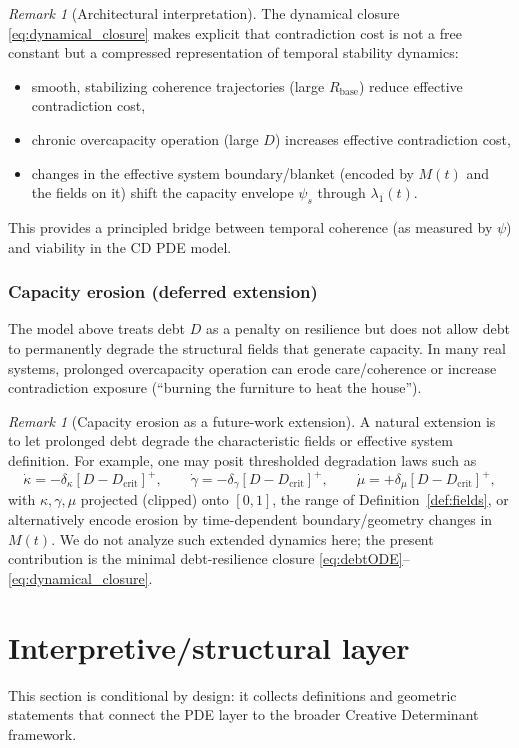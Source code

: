 \documentclass[11pt]{article}
\theoremstyle{plain}
\theoremstyle{definition}
\theoremstyle{remark}
\newtheorem{remark}[theorem]{Remark}
\begin{document}
\begin{remark}[Architectural interpretation]
The dynamical closure \eqref{eq:dynamical_closure} makes explicit that contradiction cost is not a free constant but a compressed representation of temporal stability dynamics:
\begin{itemize}
\item smooth, stabilizing coherence trajectories (large $R_{\mathrm{base}}$) reduce effective contradiction cost,
\item chronic overcapacity operation (large $D$) increases effective contradiction cost,
\item changes in the effective system boundary/blanket (encoded by $M(t)$ and the fields on it) shift the capacity envelope $\psi_s$ through $\lambda_1(t)$.
\end{itemize}
This provides a principled bridge between temporal coherence (as measured by $\psi$) and viability in the CD PDE model.
\end{remark}

\subsubsection*{Capacity erosion (deferred extension)}
The model above treats debt $D$ as a penalty on resilience but does not allow debt to permanently degrade the structural fields that generate capacity. In many real systems, prolonged overcapacity operation can erode care/coherence or increase contradiction exposure (``burning the furniture to heat the house'').

\begin{remark}[Capacity erosion as a future-work extension]\label{rem:capacity_erosion}
A natural extension is to let prolonged debt degrade the characteristic fields or effective system definition. For example, one may posit thresholded degradation laws such as
\[
\dot\kappa = -\delta_\kappa [D-D_{\mathrm{crit}}]^+,\qquad
\dot\gamma = -\delta_\gamma [D-D_{\mathrm{crit}}]^+,\qquad
\dot\mu = +\delta_\mu [D-D_{\mathrm{crit}}]^+,
\]
with \(\kappa,\gamma,\mu\) projected (clipped) onto \([0,1]\), the range of Definition~\ref{def:fields}, or alternatively encode erosion by time-dependent boundary/geometry changes in $M(t)$.
We do not analyze such extended dynamics here; the present contribution is the minimal debt-resilience closure \eqref{eq:debtODE}--\eqref{eq:dynamical_closure}.
\end{remark}

\section{Interpretive/structural layer}
This section is conditional by design: it collects definitions and geometric statements that connect the PDE layer to the broader Creative Determinant framework.
\end{document}
